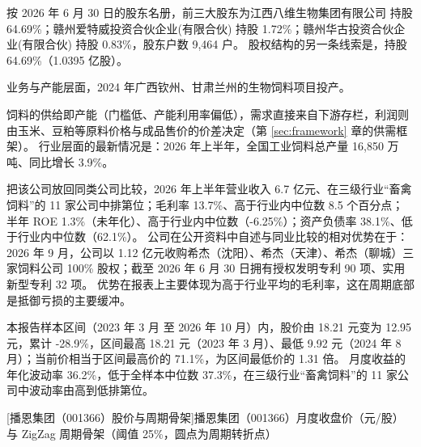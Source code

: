  按 2026 年 6 月 30 日的股东名册，前三大股东为江西八维生物集团有限公司 持股 64.69\%；赣州爱特威投资合伙企业(有限合伙) 持股 1.72\%；赣州华古投资合伙企业(有限合伙) 持股 0.83\%，股东户数 9,464 户。 股权结构的另一条线索是，持股 64.69\%（1.0395 亿股）。

 业务与产能层面，2024 年广西钦州、甘肃兰州的生物饲料项目投产。

 饲料的供给即产能（门槛低、产能利用率偏低），需求直接来自下游存栏，利润则由玉米、豆粕等原料价格与成品售价的价差决定（第 \ref{sec:framework} 章的供需框架）。 行业层面的最新情况是：2026 年上半年，全国工业饲料总产量 16,850 万吨、同比增长 3.9\%。

 把该公司放回同类公司比较，2026 年上半年营业收入 6.7 亿元、在三级行业“畜禽饲料”的 11 家公司中排第位；毛利率 13.7\%、高于行业内中位数 8.5 个百分点；半年 ROE 1.3\%（未年化）、高于行业内中位数（-6.25\%）；资产负债率 38.1\%、低于行业内中位数（62.1\%）。 公司在公开资料中自述与同业比较的相对优势在于：2026 年 9 月，公司以 1.12 亿元收购希杰（沈阳）、希杰（天津）、希杰（聊城）三家饲料公司 100\% 股权；截至 2026 年 6 月 30 日拥有授权发明专利 90 项、实用新型专利 32 项。 优势在报表上主要体现为高于行业平均的毛利率，这在周期底部是抵御亏损的主要缓冲。

 本报告样本区间（2023 年 3 月 至 2026 年 10 月）内，股价由 18.21 元变为 12.95 元，累计 -28.9\%，区间最高 18.21 元（2023 年 3 月）、最低 9.92 元（2024 年 8 月）；当前价相当于区间最高价的 71.1\%，为区间最低价的 1.31 倍。 月度收益的年化波动率 36.2\%，低于全样本中位数 37.3\%，在三级行业“畜禽饲料”的 11 家公司中波动率由高到低排第位。

\begin{center}
\begin{minipage}{\textwidth}\centering
{}

[播恩集团（001366）股价与周期骨架]{播恩集团（001366）月度收盘价（元/股）与 ZigZag 周期骨架（阈值 25\%，圆点为周期转折点）}
\end{minipage}
\end{center}

